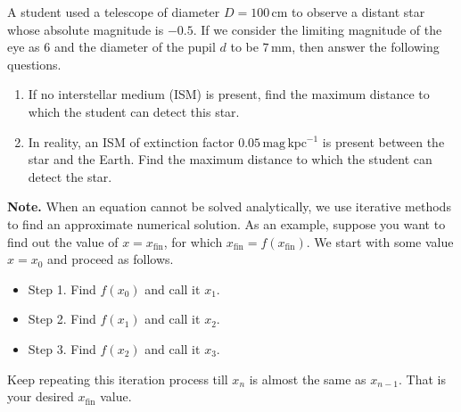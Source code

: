 A student used a telescope of diameter $D=100\,\mathrm{cm}$ to observe a distant star whose absolute magnitude is $-0.5$. If we consider the limiting magnitude of the eye as 6 and the diameter of the pupil $d$ to be $7\,\mathrm{mm}$, then answer the following questions.
\begin{enumerate}
\item If no interstellar medium (ISM) is present, find the maximum distance to which the student can detect this star.
\item In reality, an ISM of extinction factor $0.05\,\mathrm{mag\,kpc^{-1}}$ is present between the star and the Earth. Find the maximum distance to which the student can detect the star.
\end{enumerate}
\textbf{Note.} When an equation cannot be solved analytically, we use iterative methods to find an approximate numerical solution. As an example, suppose you want to find out the value of $x=x_{\mathrm{fin}}$, for which $x_{\mathrm{fin}}=f(x_{\mathrm{fin}})$. We start with some value $x=x_0$ and proceed as follows.
\begin{itemize}
\item Step 1. Find $f(x_0)$ and call it $x_1$.
\item Step 2. Find $f(x_1)$ and call it $x_2$.
\item Step 3. Find $f(x_2)$ and call it $x_3$.
\end{itemize}
Keep repeating this iteration process till $x_n$ is almost the same as $x_{n-1}$. That is your desired $x_{\mathrm{fin}}$ value.
